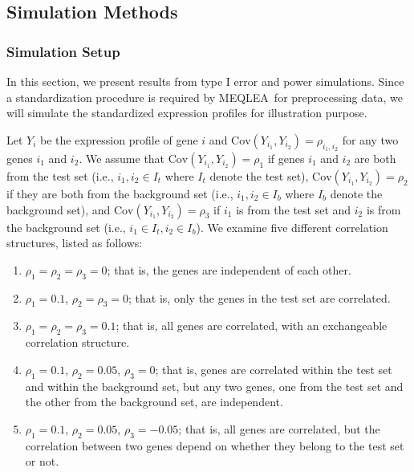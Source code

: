\documentclass[useAMS,usenatbib, galley]{biom}
\newcommand{\OurMethod}{MEQLEA}
\newcommand{\aaCase}{a}
\newcommand{\aCase}{b}
\newcommand{\cCase}{c}
\newcommand{\eCase}{d}
\newcommand{\fCase}{e}
\begin{document}
	\subsection{Simulation Methods}
	
		\subsubsection{Simulation Setup}\label{subsection:simulation}
		In this section, we present results from type I error and power simulations. Since a standardization procedure is required by \OurMethod~for preprocessing data, we will simulate the standardized expression profiles for illustration purpose. 
		
		Let $Y_{i}$ be the expression profile of gene $i$ and $\text{Cov}(Y_{i_1}, Y_{i_2})=\rho_{i_1, i_2}$ for any two genes $i_1$ and $i_2$. We assume that $\text{Cov}(Y_{i_1}, Y_{i_2})= \rho_1$ if genes $i_1$ and $i_2$ are both from the test set (i.e., $i_1, i_2 \in I_t$ where $I_t$ denote the test set),  $\text{Cov}(Y_{i_1}, Y_{i_2}) =\rho_2$ if they are both from the background set (i.e.,  $ i_1, i_2\in I_b$ where $I_b$ denote the background set), and  $\text{Cov}(Y_{i_1}, Y_{i_2})= \rho_3$ if $i_1$ is from the test set and $i_2$ is from the background set (i.e., $i_1\in I_t, i_2\in I_b$). We examine five different correlation structures, listed as follows:
		
		\begin{enumerate}
			\item[(\aaCase):] $\rho_1 = \rho_2 = \rho_3 = 0$; that is, the genes are independent of each other.
			\item[(\aCase):] $\rho_1 = 0.1$, $\rho_2 = \rho_3 = 0$; that is, only the genes in the test set are correlated.
			\item[(\cCase):] $\rho_1 = \rho_2 = \rho_3 = 0.1$; that is, all genes are correlated, with an exchangeable correlation structure. 
			\item[(\eCase):] $\rho_1 = 0.1$, $\rho_2 = 0.05$, $\rho_3 = 0$; that is, 
			genes are correlated within the test set and within the background set, but any two genes, one from the test set and the other from the background set, are independent.
			\item[(\fCase):] $\rho_1 = 0.1$, $\rho_2 = 0.05$, $\rho_3 = -0.05$; that is, all genes are correlated, but the correlation between two genes depend on whether they belong to the test set or not.
		\end{enumerate}
		
\end{document}
